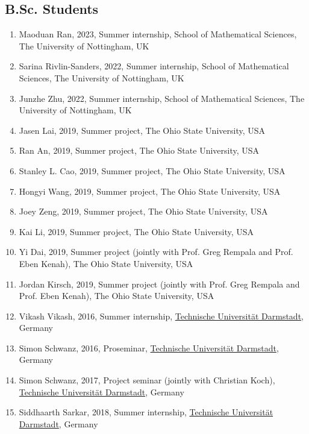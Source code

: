 \documentclass[11pt,a4paper,sans]{moderncv}        %
\begin{document}
\subsection{B.Sc. Students}
\begin{enumerate}
	\item Maoduan Ran, 2023, Summer internship, School of Mathematical Sciences, The University of Nottingham, UK
	\item Sarina Rivlin-Sanders, 2022, Summer internship, School of Mathematical Sciences, The University of Nottingham, UK
	\item Junzhe Zhu, 2022, Summer internship, School of Mathematical Sciences, The University of Nottingham, UK
	\item Jasen Lai, 2019, Summer project, The Ohio State University, USA 
	\item Ran An, 2019, Summer project, The Ohio State University, USA
	\item Stanley L. Cao, 2019, Summer project, The Ohio State University, USA
	\item Hongyi Wang, 2019, Summer project, The Ohio State University, USA
	\item Joey Zeng, 2019, Summer project, The Ohio State University, USA
	\item Kai Li, 2019, Summer project, The Ohio State University, USA
	\item Yi Dai, 2019, Summer project (jointly with Prof. Greg Rempala and Prof. Eben Kenah), The Ohio State University, USA 
	\item Jordan Kirsch, 2019, Summer project (jointly with Prof. Greg Rempala and Prof. Eben Kenah), The Ohio State University, USA
	\item Vikash Vikash, 2016, Summer internship, \href{http://www.tu-darmstadt.de/index.en.jsp}{Technische Universit\"{a}t Darmstadt}, Germany%
	\item Simon Schwanz, 2016, Proseminar, \href{http://www.tu-darmstadt.de/index.en.jsp}{Technische Universit\"{a}t Darmstadt}, Germany
	\item Simon Schwanz, 2017, Project seminar (jointly with Christian Koch), \href{http://www.tu-darmstadt.de/index.en.jsp}{Technische Universit\"{a}t Darmstadt}, Germany
	\item Siddhaarth Sarkar, 2018, Summer internship, \href{http://www.tu-darmstadt.de/index.en.jsp}{Technische Universit\"{a}t Darmstadt}, Germany
\end{enumerate}
\end{document}

